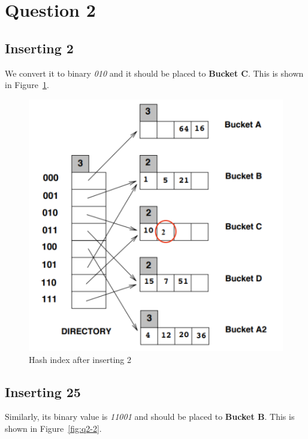 \section{Question 2}\label{question-2}

\subsection{Inserting 2}

We convert it to binary \textit{010} and it should be placed to \textbf{Bucket C}. This is shown in Figure~\ref{fig:q2-1}.

\begin{figure}[H]
  \centering
  \includegraphics[width=0.9\linewidth]{figs/q2-1.png}
  \caption{Hash index after inserting 2}
  \label{fig:q2-1}
\end{figure}

\subsection{Inserting 25}

Similarly, its binary value is \textit{11001} and should be placed to \textbf{Bucket B}. This is shown in Figure~\ref{fig:q2-2}.

